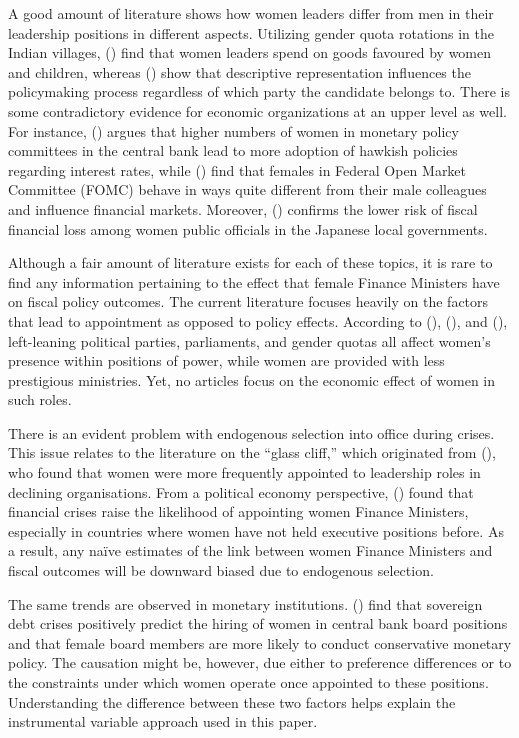 \documentclass[12pt]{article}
\renewcommand{\citet}[1]{\textit{\citeauthor{#1}} (\citeyear{#1})}
\begin{document}
A good amount of literature shows how women leaders differ from men in their leadership positions in different aspects. Utilizing gender quota rotations in the Indian villages, \citet{chattopadhyay2004} find that women leaders spend on goods favoured by women and children, whereas \citet{pande2003} show that descriptive representation influences the policymaking process regardless of which party the candidate belongs to. There is some contradictory evidence for economic organizations at an upper level as well. For instance, \citet{masciandaro2020} argues that higher numbers of women in monetary policy committees in the central bank lead to more adoption of hawkish policies regarding interest rates, while \citet{ainsley2020} find that females in Federal Open Market Committee (FOMC) behave in ways quite different from their male colleagues and influence financial markets. Moreover, \citet{suzuki2018} confirms the lower risk of fiscal financial loss among women public officials in the Japanese local governments.

Although a fair amount of literature exists for each of these topics, it is rare to find any information pertaining to the effect that female Finance Ministers have on fiscal policy outcomes. The current literature focuses heavily on the factors that lead to appointment as opposed to policy effects. According to \citet{krook2012}, \citet{obrien2015}, and \citet{field2021}, left-leaning political parties, parliaments, and gender quotas all affect women’s presence within positions of power, while women are provided with less prestigious ministries. Yet, no articles focus on the economic effect of women in such roles.

There is an evident problem with endogenous selection into office during crises. This issue relates to the literature on the ``glass cliff,'' which originated from \citet{ryan2005}, who found that women were more frequently appointed to leadership roles in declining organisations. From a political economy perspective, \citet{armstrong2024} found that financial crises raise the likelihood of appointing women Finance Ministers, especially in countries where women have not held executive positions before. As a result, any naïve estimates of the link between women Finance Ministers and fiscal outcomes will be downward biased due to endogenous selection.

The same trends are observed in monetary institutions. \citet{kern2025} find that sovereign debt crises positively predict the hiring of women in central bank board positions and that female board members are more likely to conduct conservative monetary policy. The causation might be, however, due either to preference differences or to the constraints under which women operate once appointed to these positions. Understanding the difference between these two factors helps explain the instrumental variable approach used in this paper.
\end{document}
